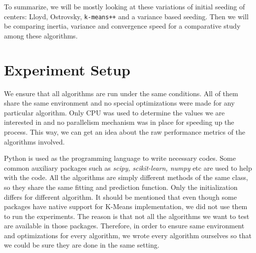 \documentclass[10pt, leqno]{article}
\begin{document}
	To summarize, we will be mostly looking at these variations of initial seeding of centers: Lloyd, Ostrovsky, \texttt{k-means++} and a variance based seeding. Then we will be comparing inertia, variance and convergence speed for a comparative study among these algorithms.
	\section{Experiment Setup}
	We ensure that all algorithms are run under the same conditions. All of them share the same environment and no special optimizations were made for any particular algorithm. Only CPU was used to determine the values we are interested in and no parallelism mechanism was in place for speeding up the process. This way, we can get an idea about the raw performance metrics of the algorithms involved.
	
	Python is used as the programming language to write necessary codes. Some common auxiliary packages such as \textit{scipy, scikit-learn, numpy} etc are used to help with the code. All the algorithms are simply different methods of the same class, so they share the same fitting and prediction function. Only the initialization differs for different algorithm. It should be mentioned that even though some packages have native support for K-Means implementation, we did not use them to run the experiments. The reason is that not all the algorithms we want to test are available in those packages. Therefore, in order to ensure same environment and optimizations for every algorithm, we wrote every algorithm ourselves so that we could be sure they are done in the same setting.
	
\end{document}
